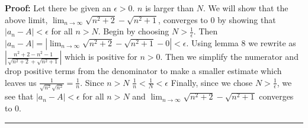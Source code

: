 \documentclass[12pt]{article}
\newcommand\qedsym{\hfill \rule{2mm}{2mm}}
\begin{document}
\bigskip

\textbf{Proof:} Let there be given an $\epsilon > 0$. $n$ is larger than $N$. We will show that the above limit, $\lim_{n\to \infty}\sqrt{n^2+2}-\sqrt{n^2+1}$, converges to $0$ by showing that $|a_n - A| < \epsilon$ for all $n > N$. Begin by choosing $N > \frac{1}{\epsilon}$. Then $|a_n - A| = | \lim_{n\to \infty}\sqrt{n^2+2}-\sqrt{n^2+1} - 0 | < \epsilon$. Using lemma 8 we rewrite as $|\frac{n^2+2-n^2-1}{\sqrt{n^2+2}+\sqrt{n^2+1}}|$ which is positive for $n>0$. Then we simplify the numerator and drop positive terms from the denominator to make a smaller estimate which leaves us $\frac{1}{\sqrt{n^2}\sqrt{n^2}} = \frac{1}{n}$. Since $n>N$ $\frac{1}{n} < \frac{1}{N} < \epsilon$ Finally, since we chose $N > \frac{1}{\epsilon}$, we see that $|a_n - A| < \epsilon$ for all $n > N$ and $\lim_{n\to \infty}\sqrt{n^2+2}-\sqrt{n^2+1}$ converges to $0$.\qedsym{}
\end{document}
